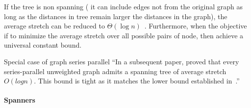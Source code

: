 If the tree is non spanning (\ie{} it can include edges not from the original graph as long as the
distances in tree remain larger the distances in the graph), the average stretch can be reduced to
$\Theta(\log n)$~\autocite{lognMetricBoundConf03}. Furthermore, when the objective if to minimize
the average stretch over all possible pairs of node, then \textcite{constantDistortion07} achieve a
universal constant bound.

Special case of graph
series parallel
\enquote{In a subsequent paper, \textcite{seriesParallel06} proved that every series-parallel
unweighted graph admits a spanning tree of average stretch $O(log n)$. This bound is tight as it
matches the lower bound established in~\autocite{cutsTrees99}.}

\paragraph{Spanners}
\label{par:spanners}


